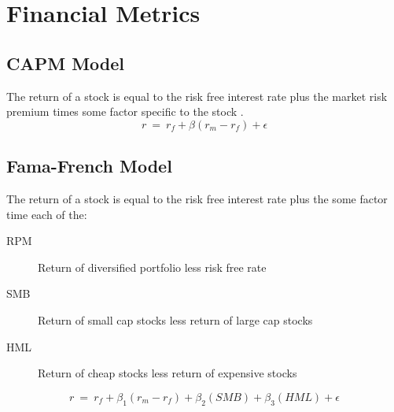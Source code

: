 




\section{Financial Metrics}
\subsection{CAPM Model}\label{sec:capm}
The return of a stock is equal to the risk free interest rate plus the market risk premium times some factor specific to the stock \cite{sharpe1964capital}.
$$r\ =\ r_f + \beta(r_m - r_f) + \epsilon$$
\subsection{Fama-French Model}\label{sec:famaFrench}
The return of a stock \cite{fama1992cross} is equal to the risk free interest rate plus the some factor time each of the:
\begin{description}
	\item[RPM] Return of diversified portfolio less risk free rate
	\item[SMB] Return of small cap stocks less return of large cap stocks
	\item[HML] Return of cheap stocks less return of expensive stocks
\end{description}
$$r\ =\ r_f + \beta_1(r_m - r_f) + \beta_2(SMB) + \beta_3(HML) + \epsilon$$

